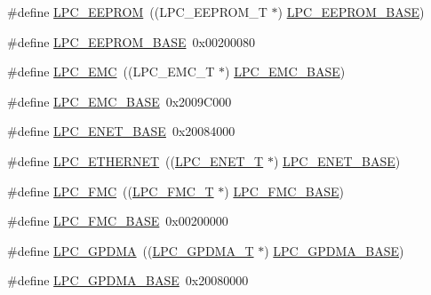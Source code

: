 \begin{DoxyCompactItemize}
\item 
\#define \hyperlink{group__PERIPH__177X__8X__BASE_ga3af7cc9a426f661ac4deee8a9997a830}{L\+P\+C\+\_\+\+E\+E\+P\+R\+OM}~((L\+P\+C\+\_\+\+E\+E\+P\+R\+O\+M\+\_\+T           $\ast$) \hyperlink{group__PERIPH__407X__8X__BASE_ga9d1fcaafb9feb0f8253c3cef1edc7e9f}{L\+P\+C\+\_\+\+E\+E\+P\+R\+O\+M\+\_\+\+B\+A\+SE})
\item 
\#define \hyperlink{group__PERIPH__177X__8X__BASE_ga9d1fcaafb9feb0f8253c3cef1edc7e9f}{L\+P\+C\+\_\+\+E\+E\+P\+R\+O\+M\+\_\+\+B\+A\+SE}~0x00200080
\item 
\#define \hyperlink{group__PERIPH__177X__8X__BASE_ga115afed5bd08559bbc4eba50e7c23495}{L\+P\+C\+\_\+\+E\+MC}~((L\+P\+C\+\_\+\+E\+M\+C\+\_\+T              $\ast$) \hyperlink{group__PERIPH__407X__8X__BASE_ga52f586bf3c6855ad4ef03b1fee3f2f0d}{L\+P\+C\+\_\+\+E\+M\+C\+\_\+\+B\+A\+SE})
\item 
\#define \hyperlink{group__PERIPH__177X__8X__BASE_ga52f586bf3c6855ad4ef03b1fee3f2f0d}{L\+P\+C\+\_\+\+E\+M\+C\+\_\+\+B\+A\+SE}~0x2009\+C000
\item 
\#define \hyperlink{group__PERIPH__177X__8X__BASE_ga73c18d53000abe3814c4b787cd83a57c}{L\+P\+C\+\_\+\+E\+N\+E\+T\+\_\+\+B\+A\+SE}~0x20084000
\item 
\#define \hyperlink{group__PERIPH__177X__8X__BASE_gaddb977e4442891b21ced3344c71440d7}{L\+P\+C\+\_\+\+E\+T\+H\+E\+R\+N\+ET}~((\hyperlink{structLPC__ENET__T}{L\+P\+C\+\_\+\+E\+N\+E\+T\+\_\+T}             $\ast$) \hyperlink{group__PERIPH__407X__8X__BASE_ga73c18d53000abe3814c4b787cd83a57c}{L\+P\+C\+\_\+\+E\+N\+E\+T\+\_\+\+B\+A\+SE})
\item 
\#define \hyperlink{group__PERIPH__177X__8X__BASE_ga406fa416fe50b196b86146ba0b20ba3c}{L\+P\+C\+\_\+\+F\+MC}~((\hyperlink{structLPC__FMC__T}{L\+P\+C\+\_\+\+F\+M\+C\+\_\+T}              $\ast$) \hyperlink{group__PERIPH__407X__8X__BASE_gaad6b7f57ab13bf5886da624bbb4bcc61}{L\+P\+C\+\_\+\+F\+M\+C\+\_\+\+B\+A\+SE})
\item 
\#define \hyperlink{group__PERIPH__177X__8X__BASE_gaad6b7f57ab13bf5886da624bbb4bcc61}{L\+P\+C\+\_\+\+F\+M\+C\+\_\+\+B\+A\+SE}~0x00200000
\item 
\#define \hyperlink{group__PERIPH__177X__8X__BASE_gaf9d4b843ddff8d08a27880f90e2dbf18}{L\+P\+C\+\_\+\+G\+P\+D\+MA}~((\hyperlink{structLPC__GPDMA__T}{L\+P\+C\+\_\+\+G\+P\+D\+M\+A\+\_\+T}            $\ast$) \hyperlink{group__PERIPH__407X__8X__BASE_ga51ba8e3f33730fa2b78be3f892d8c278}{L\+P\+C\+\_\+\+G\+P\+D\+M\+A\+\_\+\+B\+A\+SE})
\item 
\#define \hyperlink{group__PERIPH__177X__8X__BASE_ga51ba8e3f33730fa2b78be3f892d8c278}{L\+P\+C\+\_\+\+G\+P\+D\+M\+A\+\_\+\+B\+A\+SE}~0x20080000

\end{DoxyCompactItemize}
